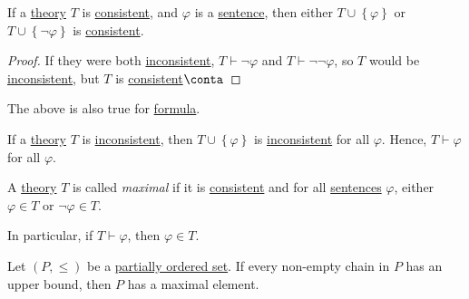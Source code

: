 \begin{proposition}
	If a \hyperref[def:theory]{theory} \(T\) is \hyperref[def:consistent]{consistent}, and \(\varphi \) is a \hyperref[def:sentence]{sentence}, then either \(T\cup \left\{ \varphi  \right\} \) or \(T\cup \left\{ \lnot \varphi \right\} \) is \hyperref[def:consistent]{consistent}.
\end{proposition}
\begin{proof}
	If they were both \hyperref[def:inconsistent]{inconsistent}, \(T\vdash \lnot \varphi \) and \(T\vdash \lnot \lnot \varphi \), so \(T\) would be \hyperref[def:inconsistent]{inconsistent}, but \(T\) is \hyperref[def:consistent]{consistent}\(\conta\)
\end{proof}

\begin{note}
	The above is also true for \hyperref[def:formula]{formula}.
\end{note}

\begin{proposition}
	If a \hyperref[def:theory]{theory} \(T\) is \hyperref[def:inconsistent]{inconsistent}, then \(T\cup \left\{ \varphi  \right\} \) is \hyperref[def:inconsistent]{inconsistent} for all \(\varphi \). Hence, \(T\vdash \varphi \) for all \(\varphi \).
\end{proposition}

\begin{definition}[Maximal]\label{def:maximal}
	A \hyperref[def:theory]{theory} \(T\) is called \emph{maximal} if it is \hyperref[def:consistent]{consistent} and for all \hyperref[def:sentence]{sentences} \(\varphi \), either \(\varphi \in T\) or \(\lnot \varphi \in T\).
\end{definition}

In particular, if \(T\vdash \varphi \), then \(\varphi \in T\).

\begin{theorem}\label{thm:zorn}
	Let \((P, \leq )\) be a \href{https://en.wikipedia.org/wiki/Partially_ordered_set}{partially ordered set}. If every non-empty chain in \(P\) has an upper bound, then \(P\) has a maximal element.
\end{theorem}

